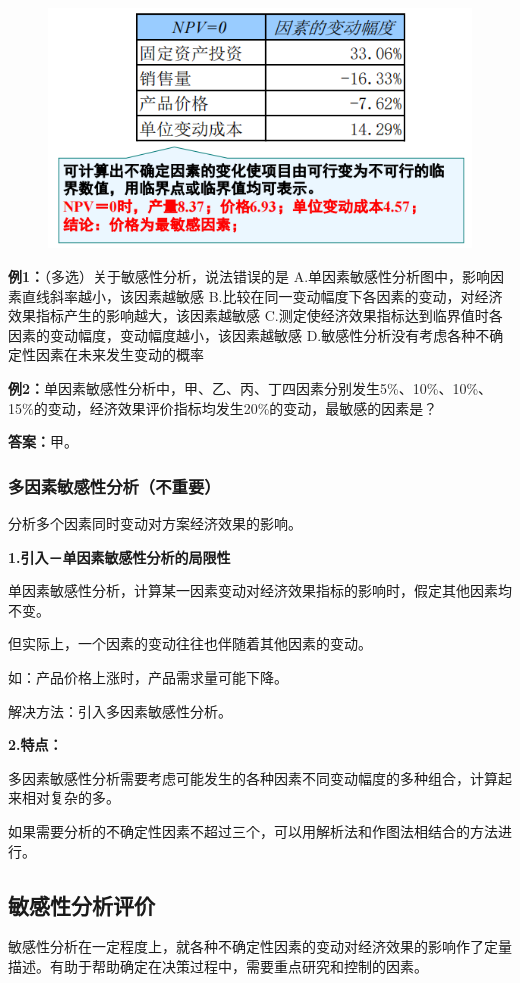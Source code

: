 \begin{figure}[H]
    \centering
    \includegraphics[width=0.75\linewidth]{image/绝对测定法.png}
\end{figure}

\textbf{例1：}（多选）关于敏感性分析，说法错误的是
A.单因素敏感性分析图中，影响因素直线斜率越小，该因素越敏感
B.比较在同一变动幅度下各因素的变动，对经济效果指标产生的影响越大，该因素越敏感
C.测定使经济效果指标达到临界值时各因素的变动幅度，变动幅度越小，该因素越敏感
D.敏感性分析没有考虑各种不确定性因素在未来发生变动的概率

\textbf{例2：}单因素敏感性分析中，甲、乙、丙、丁四因素分别发生5\%、10\%、10\%、15\%的变动，经济效果评价指标均发生20\%的变动，最敏感的因素是？

\textbf{答案：}甲。



\subsubsection{多因素敏感性分析（不重要）}
分析多个因素同时变动对方案经济效果的影响。

\noindent \textbf{1.引入－单因素敏感性分析的局限性}

单因素敏感性分析，计算某一因素变动对经济效果指标的影响时，假定其他因素均不变。

但实际上，一个因素的变动往往也伴随着其他因素的变动。

如：产品价格上涨时，产品需求量可能下降。

解决方法：引入多因素敏感性分析。

\noindent \textbf{2.特点：}

多因素敏感性分析需要考虑可能发生的各种因素不同变动幅度的多种组合，计算起来相对复杂的多。

如果需要分析的不确定性因素不超过三个，可以用解析法和作图法相结合的方法进行。

\subsection{敏感性分析评价}
敏感性分析在一定程度上，就各种不确定性因素的变动对经济效果的影响作了定量描述。有助于帮助确定在决策过程中，需要重点研究和控制的因素。

